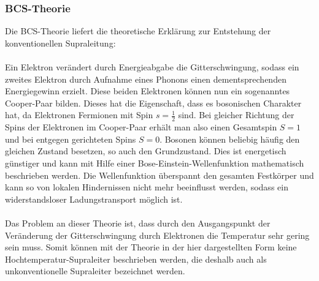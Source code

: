 \documentclass[german,  %
parskip=full,  %
]{scrartcl}
\begin{document}
\subsubsection{BCS-Theorie}
Die BCS-Theorie liefert die theoretische Erklärung zur Entstehung der konventionellen Supraleitung:
\\\\
Ein Elektron verändert durch Energieabgabe die Gitterschwingung, sodass ein zweites Elektron durch Aufnahme eines Phonons einen dementsprechenden Energiegewinn erzielt. Diese beiden Elektronen können nun ein sogenanntes Cooper-Paar bilden. Dieses hat die Eigenschaft, dass es bosonischen Charakter hat, da Elektronen Fermionen mit Spin $s = \frac{1}{2}$ sind. Bei gleicher Richtung der Spins der Elektronen im Cooper-Paar erhält man also einen Gesamtspin $S=1$ und bei entgegen gerichteten Spins $S=0$. Bosonen können beliebig häufig den gleichen Zustand besetzen, so auch den Grundzustand. Dies ist energetisch günstiger und kann mit Hilfe einer Bose-Einstein-Wellenfunktion mathematisch beschrieben werden. Die Wellenfunktion überspannt den gesamten Festkörper und kann so von lokalen Hindernissen nicht mehr beeinflusst werden, sodass ein widerstandsloser Ladungstransport möglich ist.
\\\\
Das Problem an dieser Theorie ist, dass durch den Ausgangspunkt der Veränderung der Gitterschwingung durch Elektronen die Temperatur sehr gering sein muss. Somit können mit der Theorie in der hier dargestellten Form keine Hochtemperatur-Supraleiter beschrieben werden, die deshalb auch als unkonventionelle Supraleiter bezeichnet werden.
\end{document}
